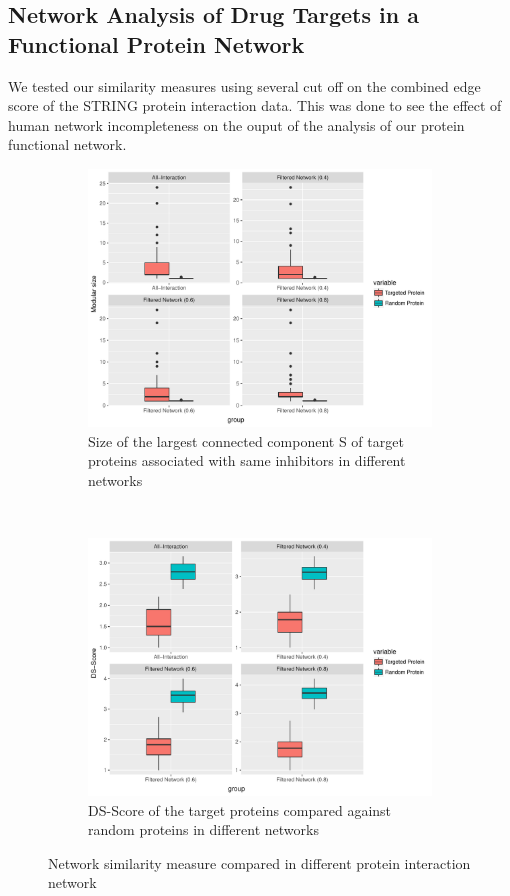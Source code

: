 \documentclass[a4paper, 11pt]{report}
\begin{document}
\subsection{Network Analysis of Drug Targets in a Functional Protein Network}
We tested our similarity measures using several cut off on the combined edge score of the STRING protein interaction data. This was done to see the effect of human network incompleteness on the ouput of the analysis of our protein functional network.
\begin{figure}[H]
\centering
\begin{subfigure}{.7\textwidth}
  \centering
  \includegraphics[width=\linewidth]{figures/module_size.pdf}
  \caption{Size of the largest connected component S of target proteins associated with same inhibitors in different networks}
  \label{module_size}
\end{subfigure}\\
\begin{subfigure}{.7\textwidth}
  \centering
  \includegraphics[width=\linewidth]{figures/ds_scoreplot.pdf}
    \caption{DS-Score of the target proteins compared against random proteins in different networks }
  \label{dsscore_plot}
\end{subfigure}
\caption{Network similarity measure compared in different protein interaction network}
\label{Network_sim}
\end{figure}
\end{document}
